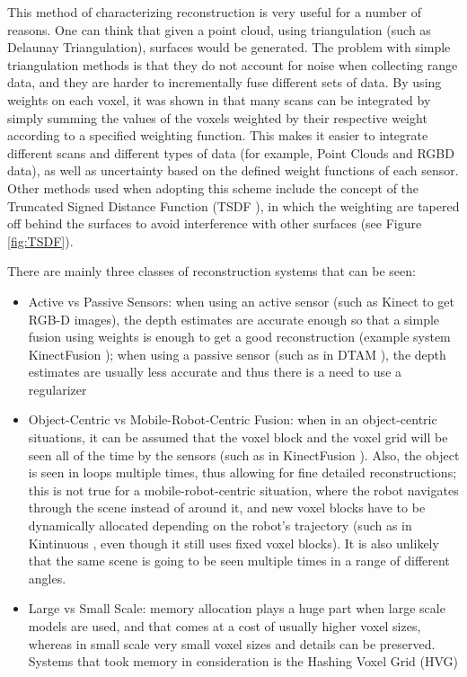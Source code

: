 \documentclass[11pt]{article}
\begin{document}
This method of characterizing reconstruction is very useful for a number of reasons. One can think that given a point cloud, using triangulation (such as Delaunay Triangulation), surfaces would be generated. The problem with simple triangulation methods is that they do not account for noise when collecting range data, and they are harder to incrementally fuse different sets of data. By using weights on each voxel, it was shown in \cite{TSDF} that many scans can be integrated by simply summing the values of the voxels weighted by their respective weight according to a specified weighting function. This makes it easier to integrate different scans and different types of data (for example, Point Clouds and RGBD data), as well as uncertainty based on the defined weight functions of each sensor. Other methods used when adopting this scheme include the concept of the Truncated Signed Distance Function (TSDF \cite{TSDF}), in which the weighting are tapered off behind the surfaces to avoid interference with other surfaces (see Figure \ref{fig:TSDF}).

There are mainly three classes of reconstruction systems that can be seen:
	
\begin{itemize}
\item Active vs Passive Sensors: when using an active sensor (such as Kinect to get RGB-D images), the depth estimates are accurate enough so that a simple fusion using weights is enough to get a good reconstruction (example system KinectFusion \cite{kinectfusion}); when using a passive sensor (such as in DTAM \cite{DTAM}), the depth estimates are usually less accurate and thus there is a need to use a regularizer
\item Object-Centric vs Mobile-Robot-Centric Fusion: when in an object-centric situations, it can be assumed that the voxel block and the voxel grid will be seen all of the time by the sensors (such as in KinectFusion \cite{kinectfusion}). Also, the object is seen in loops multiple times, thus allowing for fine detailed reconstructions; this is not true for a mobile-robot-centric situation, where the robot navigates through the scene instead of around it, and new voxel blocks have to be dynamically allocated depending on the robot's trajectory (such as in Kintinuous \cite{kintinuous}, even though it still uses fixed voxel blocks). It is also unlikely that the same scene is going to be seen multiple times in a range of different angles.
\item Large vs Small Scale: memory allocation plays a huge part when large scale models are used, and that comes at a cost of usually higher voxel sizes, whereas in small scale very small voxel sizes and details can be preserved. Systems that took memory in consideration is the Hashing Voxel Grid (HVG) \cite{HVG}
\end{itemize}
	
\end{document}
